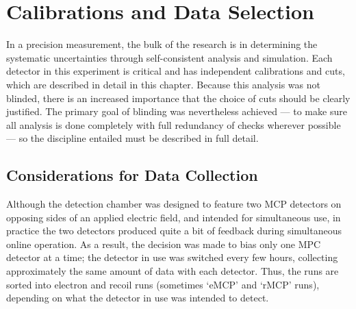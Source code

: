 %
%
%
\clearpage
\chapter{Calibrations and Data Selection}
\label{calibrations_chapter}
\label{dataselection_chapter}
In a precision measurement, the bulk of the research is in determining the systematic uncertainties through self-consistent analysis and simulation.  Each detector in this experiment is critical and has independent calibrations and cuts, which are described in detail in this chapter.  Because this analysis was not blinded, there is an increased importance that the choice of cuts should be clearly justified.  The primary goal of blinding was nevertheless achieved --- to make sure all analysis is done completely with full redundancy of checks wherever possible --- so the discipline entailed must be described in full detail.


\section{Considerations for Data Collection}
\label{sec:dataconsiderations}
Although the detection chamber was designed to feature two \ac{MCP} detectors on opposing sides of an applied electric field, and intended for simultaneous use, in practice the two detectors produced quite a bit of feedback during simultaneous online operation.  %
As a result, the decision was made to bias only one MPC detector at a time;  the detector in use was switched every few hours, collecting approximately the same amount of data with each detector.  Thus, the runs are sorted into electron and recoil runs (sometimes `\ac{eMCP}' and `\ac{rMCP}' runs), depending on what the detector in use was intended to detect.  



